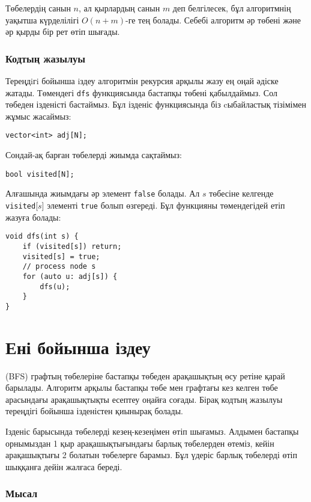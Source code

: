 Төбелердің санын $n$, ал қырлардың санын $m$ деп белгілесек, бұл алгоритмнің уақытша күрделілігі $O(n+m)$-ге тең болады. Себебі алгоритм әр төбені және әр қырды бір рет өтіп шығады.

\subsubsection*{Кодтың жазылуы}

Тереңдiгi бойынша iздеу алгоритмін рекурсия арқылы жазу ең оңай әдіске жатады. Төмендегі \texttt{dfs} функциясында бастапқы төбені қабылдаймыз. Сол төбеден ізденісті бастаймыз. Бұл ізденіс функциясында біз cыбайластық тізімімен жұмыс жасаймыз:
\begin{lstlisting}
vector<int> adj[N];
\end{lstlisting}
Сондай-ақ барған төбелерді жиымда сақтаймыз:
\begin{lstlisting}
bool visited[N];
\end{lstlisting}
Алғашында жиымдағы әр элемент \texttt{false} болады. Ал $s$ төбесіне келгенде \texttt{visited}[$s$] элементі \texttt{true} болып өзгереді.
Бұл функцияны төмендегідей етіп жазуға болады:
\begin{lstlisting}
void dfs(int s) {
    if (visited[s]) return;
    visited[s] = true;
    // process node s
    for (auto u: adj[s]) {
        dfs(u);
    }
}
\end{lstlisting}

\section{Ені бойынша іздеу}


 (BFS) графтың төбелеріне бастапқы төбеден арақашықтың өсу ретіне қарай барылады. Алгоритм арқылы бастапқы төбе мен графтағы кез келген төбе арасындағы арақашықтықты есептеу оңайға соғады. Бірақ кодтың жазылуы тереңдігі бойынша ізденістен қиынырақ болады.

Ізденіс барысында төбелерді кезең-кезеңімен өтіп шығамыз.
Алдымен бастапқы орнымыздан 1 қыр арақашықтығындағы барлық төбелерден өтеміз,
кейін арақашықтығы 2 болатын төбелерге барамыз. Бұл үдеріс барлық төбелерді өтіп шыққанға дейін жалғаса береді.

\subsubsection*{Мысал}

